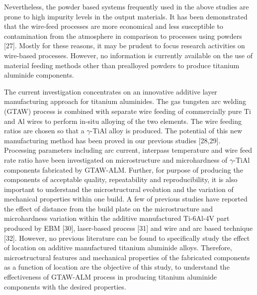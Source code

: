 \documentclass[10pt]{article}
\begin{document}
Nevertheless, the powder based systems frequently used in the above studies are prone to high impurity levels in the output materials. It has been demonstrated that the wire-feed processes are more economical and less susceptible to contamination from the atmosphere in comparison to processes using powders [27]. Mostly for these reasons, it may be prudent to focus research activities on wire-based processes. However, no information is currently available on the use of material feeding methods other than prealloyed powders to produce titanium aluminide components.

The current investigation concentrates on an innovative additive layer manufacturing approach for titanium aluminides. The gas tungsten arc welding (GTAW) process is combined with separate wire feeding of commercially pure $\mathrm{Ti}$ and $\mathrm{Al}$ wires to perform in-situ alloying of the two elements. The wire feeding ratios are chosen so that a $\gamma$-TiAl alloy is produced. The potential of this new manufacturing method has been proved in our previous studies [28,29]. Processing parameters including arc current, interpass temperature and wire feed rate ratio have been investigated on microstructure and microhardness of $\gamma$-TiAl components fabricated by GTAW-ALM. Further, for purpose of producing the components of acceptable quality, repeatability and reproducibility, it is also important to understand the microstructural evolution and the variation of mechanical properties within one build. A few of previous studies have reported the effect of distance from the build plate on the microstructure and microhardness variation within the additive manufactured Ti-6Al-4V part produced by EBM [30], laser-based process [31] and wire and arc based technique [32]. However, no previous literature can be found to specifically study the effect of location on additive manufactured titanium aluminide alloys. Therefore, microstructural features and mechanical properties of the fabricated components as a function of location are the objective of this study, to understand the effectiveness of GTAW-ALM process in producing titanium aluminide components with the desired properties.
\end{document}
